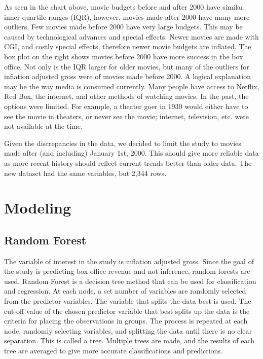 \documentclass{svproc}
\begin{document}
As seen in the chart above, movie budgets before and after 2000 have similar inner quartile ranges (IQR), however, movies made after 2000 have many more outliers. Few movies made before 2000 have very large budgets. This may be caused by technological advances and special effects. Newer movies are made with CGI, and costly special effects, therefore newer movie budgets are inflated. The box plot on the right shows movies before 2000 have more success in the box office. Not only is the IQR larger for older movies, but many of the outliers for inflation adjusted gross were of movies made before 2000. A logical explanation may be the way media is consumed currently. Many people have access to Netflix, Red Box, the internet, and other methods of watching movies. In the past, the options were limited. For example, a theater goer in 1930 would either have to see the movie in theaters, or never see the movie; internet, television, etc. were not available at the time.

Given the discrepancies in the data, we decided to limit the study to movies made after (and including) January 1st, 2000. This should give more reliable data as more recent history should reflect current trends better than older data. The new dataset had the same variables, but 2,344 rows.

\newpage
\section{Modeling}

\subsection{Random Forest}

The variable of interest in the study is inflation adjusted gross. Since the goal of the study is predicting box office revenue and not inference, random forests are used. Random Forest is a decision tree method that can be used for classification and regression. At each node, a set number of variables are randomly selected from the predictor variables. The variable that splits the data best is used. The cut-off value of the chosen predictor variable that best splits up the data is the criteria for placing the observations in groups. The process is repeated at each node, randomly selecting variables, and splitting the data until there is no clear separation. This is called a tree. Multiple trees are made, and the results of each tree are averaged to give more accurate classifications and predictions.
\end{document}
